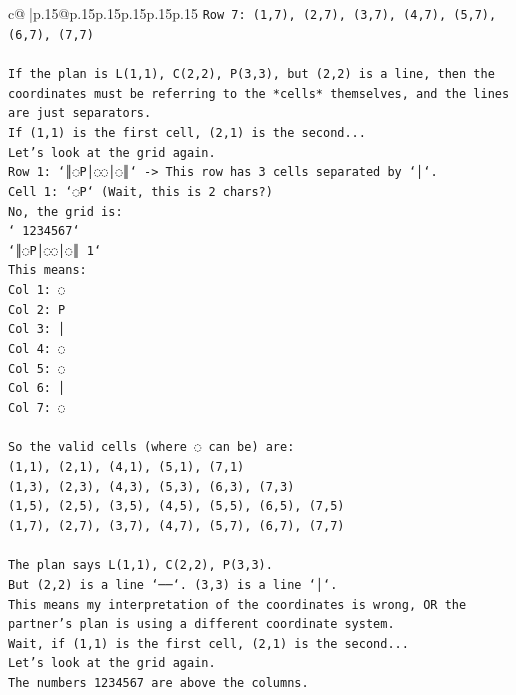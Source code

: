 \documentclass{article}
\begin{document}
{\begin{supertabular}{c@{$\;$}|p{.15\linewidth}@{}p{.15\linewidth}p{.15\linewidth}p{.15\linewidth}p{.15\linewidth}p{.15\linewidth}}
{{{\texttt{Row 7: (1,7), (2,7), (3,7), (4,7), (5,7), (6,7), (7,7)} \\
\\ 
\texttt{If the plan is L(1,1), C(2,2), P(3,3), but (2,2) is a line, then the coordinates must be referring to the *cells* themselves, and the lines are just separators.} \\
\texttt{If (1,1) is the first cell, (2,1) is the second...} \\
\texttt{Let's look at the grid again.} \\
\texttt{Row 1: `║◌P│◌◌│◌║` {-}> This row has 3 cells separated by `│`.} \\
\texttt{Cell 1: `◌P` (Wait, this is 2 chars?)} \\
\texttt{No, the grid is:} \\
\texttt{` 1234567`} \\
\texttt{`║◌P│◌◌│◌║ 1`} \\
\texttt{This means:} \\
\texttt{Col 1: ◌} \\
\texttt{Col 2: P} \\
\texttt{Col 3: │} \\
\texttt{Col 4: ◌} \\
\texttt{Col 5: ◌} \\
\texttt{Col 6: │} \\
\texttt{Col 7: ◌} \\
\\ 
\texttt{So the valid cells (where ◌ can be) are:} \\
\texttt{(1,1), (2,1), (4,1), (5,1), (7,1)} \\
\texttt{(1,3), (2,3), (4,3), (5,3), (6,3), (7,3)} \\
\texttt{(1,5), (2,5), (3,5), (4,5), (5,5), (6,5), (7,5)} \\
\texttt{(1,7), (2,7), (3,7), (4,7), (5,7), (6,7), (7,7)} \\
\\ 
\texttt{The plan says L(1,1), C(2,2), P(3,3).} \\
\texttt{But (2,2) is a line `──`. (3,3) is a line `│`.} \\
\texttt{This means my interpretation of the coordinates is wrong, OR the partner's plan is using a different coordinate system.} \\
\texttt{Wait, if (1,1) is the first cell, (2,1) is the second...} \\
\texttt{Let's look at the grid again.} \\
\texttt{The numbers 1234567 are above the columns.} \\
}}}
\end{supertabular}}
\end{document}
